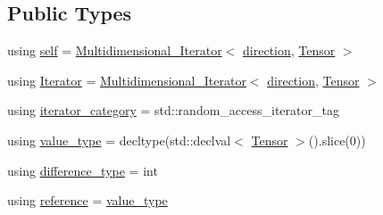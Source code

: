 \subsection*{Public Types}
\begin{DoxyCompactItemize}
\item 
using \hyperlink{structbc_1_1tensors_1_1iterators_1_1Multidimensional__Iterator_ab6cf67ef1131231cac6c58b7c821dc95}{self} = \hyperlink{structbc_1_1tensors_1_1iterators_1_1Multidimensional__Iterator}{Multidimensional\+\_\+\+Iterator}$<$ \hyperlink{namespacebc_1_1tensors_1_1iterators_ae76efe63fb9cb4985d5e4e6af0ebf296}{direction}, \hyperlink{namespacebc_a659391e47ab612be3ba6c18cf9c89159}{Tensor} $>$
\item 
using \hyperlink{structbc_1_1tensors_1_1iterators_1_1Multidimensional__Iterator_a12d78eb95b3b0fbee7c824f0a79c1513}{Iterator} = \hyperlink{structbc_1_1tensors_1_1iterators_1_1Multidimensional__Iterator}{Multidimensional\+\_\+\+Iterator}$<$ \hyperlink{namespacebc_1_1tensors_1_1iterators_ae76efe63fb9cb4985d5e4e6af0ebf296}{direction}, \hyperlink{namespacebc_a659391e47ab612be3ba6c18cf9c89159}{Tensor} $>$
\item 
using \hyperlink{structbc_1_1tensors_1_1iterators_1_1Multidimensional__Iterator_ad66df67ffb1885221a867f76b99ce4e6}{iterator\+\_\+category} = std\+::random\+\_\+access\+\_\+iterator\+\_\+tag
\item 
using \hyperlink{structbc_1_1tensors_1_1iterators_1_1Multidimensional__Iterator_a7d62a3cfbac2dd345ffcbc854aae0e42}{value\+\_\+type} = decltype(std\+::declval$<$ \hyperlink{namespacebc_a659391e47ab612be3ba6c18cf9c89159}{Tensor} $>$().slice(0))
\item 
using \hyperlink{structbc_1_1tensors_1_1iterators_1_1Multidimensional__Iterator_a040272bdf9c6d98261ebf0f710dbdd49}{difference\+\_\+type} = int
\item 
using \hyperlink{structbc_1_1tensors_1_1iterators_1_1Multidimensional__Iterator_a67c5790d500ffb8719140e7ab9861b51}{reference} = \hyperlink{structbc_1_1tensors_1_1iterators_1_1Multidimensional__Iterator_a7d62a3cfbac2dd345ffcbc854aae0e42}{value\+\_\+type}
\end{DoxyCompactItemize}
